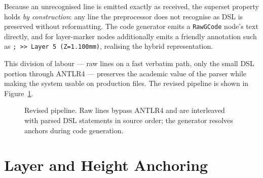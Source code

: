 Because an unrecognised line is emitted exactly as received, the superset property holds \emph{by construction}: any line the preprocessor does not recognise as DSL is preserved without reformatting. The code generator emits a \texttt{RawGCode} node's text directly, and for layer-marker nodes additionally emits a friendly annotation such as \verb|; >> Layer 5 (Z=1.100mm)|, realising the hybrid representation.

This division of labour --- raw lines on a fast verbatim path, only the small DSL portion through ANTLR4 --- preserves the academic value of the parser while making the system usable on production files. The revised pipeline is shown in Figure~\ref{fig:m3-pipeline}.

\begin{figure}[H]
\centering
{}
\caption{Revised pipeline. Raw lines bypass ANTLR4 and are interleaved with parsed DSL statements in source order; the generator resolves anchors during code generation.}
\label{fig:m3-pipeline}
\end{figure}

\section{Layer and Height Anchoring}

